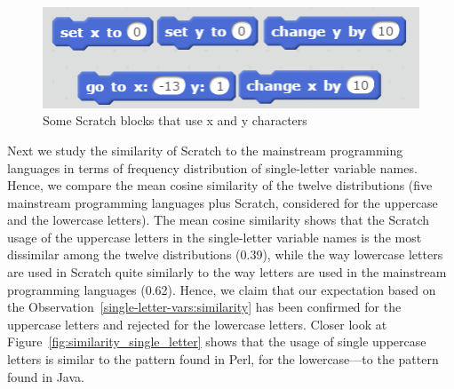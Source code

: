 \documentclass[conference]{IEEEtran}
\newcommand{\todo}[1]{ \textbf{#1} }
\begin{document}
\begin{figure}[h]
	\begin{center}
		\includegraphics[width=\columnwidth]{fig/builtinblocks_xy}
		\caption{Some Scratch blocks that use x and y characters}
		\label{fig:xy_Scratchblocks}
	\end{center}
\end{figure} 


Next we study the similarity of Scratch to the mainstream programming languages in terms of frequency distribution of single-letter variable names.
Hence, we compare the mean cosine similarity of the twelve distributions (five mainstream programming languages plus Scratch, considered for the uppercase and the lowercase letters).
The mean cosine similarity shows that the Scratch usage of the uppercase letters in the single-letter variable names is the most dissimilar among the
twelve distributions (0.39), while the way lowercase letters are used in Scratch quite similarly to the way letters are used in the mainstream programming languages (0.62).
Hence, we claim that our expectation based on the Observation~\ref{single-letter-vars:similarity} has been confirmed for the uppercase letters and  rejected for the lowercase letters. 
Closer look at Figure~\ref{fig:similarity_single_letter} shows that the usage of single uppercase letters is similar to the pattern found in Perl, for the lowercase---to the pattern found in Java.
\end{document}
